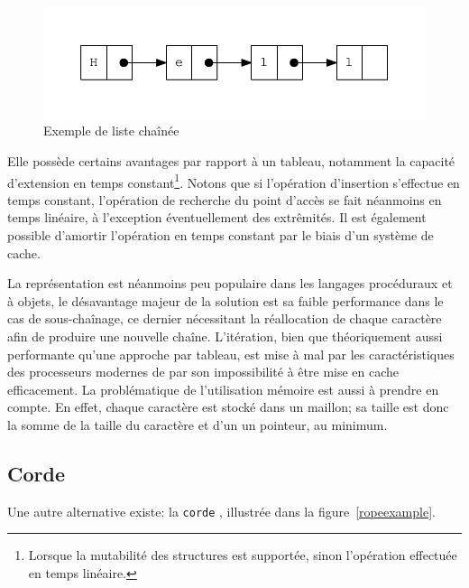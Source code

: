 \begin{figure}
	\caption{Exemple de liste chaînée}
	\label{llistexample}
	\centering
	\includegraphics{figures/linked_list.pdf}
\end{figure}

Elle possède certains avantages par rapport à un tableau, notamment la capacité d'extension
en temps constant\footnote{Lorsque la mutabilité des structures est supportée, sinon l'opération
effectuée en temps linéaire.}.
Notons que si l'opération d'insertion s'effectue en temps constant, l'opération de
recherche du point d'accès se fait néanmoins en temps linéaire, à l'exception éventuellement
des extrêmités.
Il est également possible d'amortir l'opération en temps constant par le
biais d'un système de cache.

La représentation est néanmoins peu populaire dans les langages procéduraux et à objets, le
désavantage majeur de la solution est sa faible performance dans le cas de sous-chaînage,
ce dernier nécessitant la réallocation de chaque caractère afin de produire une nouvelle
chaîne.
L'itération, bien que théoriquement aussi performante qu'une approche par tableau, est mise à
mal par les caractéristiques des processeurs modernes de par son impossibilité à être
mise en cache efficacement.
La problématique de l'utilisation mémoire est aussi à prendre en compte.
En effet, chaque caractère est stocké dans un maillon; sa taille est donc la somme de
la taille du caractère et d'un un pointeur, au minimum.

\subsection{Corde}

Une autre alternative existe: la \texttt{corde} \cite{Boehm95}, illustrée dans la figure~\ref{ropeexample}.


